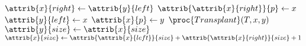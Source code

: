 \begin{codebox}
\li $\attrib{x}{right} \gets \attrib{y}{left}$
\li $\attrib{\attrib{x}{right}}{p} \gets x$
\li $\attrib{y}{left} \gets x$
\li $\attrib{x}{p} \gets y$
\li $\proc{Transplant}(T,x,y)$
\li $\attrib{y}{size} \gets \attrib{x}{size}$
\li $\attrib{x}{size} \gets \attrib{\attrib{x}{left}}{size} + \attrib{\attrib{x}{right}}{size} + 1$
\end{codebox}